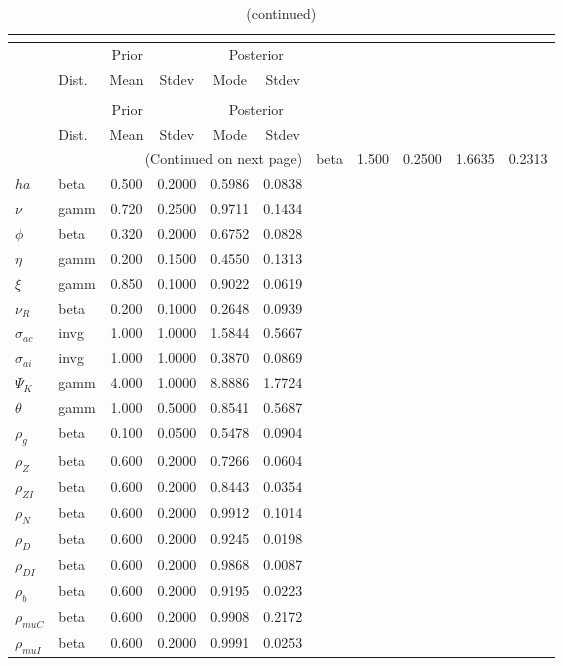  
\begin{center}
\begin{longtable}{llcccc} 
\caption{Results from posterior maximization (parameters)}\\
 \label{Table:Posterior:1}\\
\toprule 
  & \multicolumn{3}{c}{Prior}  &  \multicolumn{2}{c}{Posterior} \\
  \cmidrule(r{.75em}){2-4} \cmidrule(r{.75em}){5-6}
  & Dist. & Mean  & Stdev & Mode & Stdev \\ 
\midrule \endfirsthead 
\caption{(continued)}\\
 \bottomrule 
  & \multicolumn{3}{c}{Prior}  &  \multicolumn{2}{c}{Posterior} \\
  \cmidrule(r{.75em}){2-4} \cmidrule(r{.75em}){5-6}
  & Dist. & Mean  & Stdev & Mode & Stdev \\ 
\midrule \endhead 
\bottomrule \multicolumn{6}{r}{(Continued on next page)}\endfoot 
\bottomrule\endlastfoot 
${\sigma}$ & beta &   1.500 & 0.2500 &   1.6635 &  0.2313 \\ 
${ha}$ & beta &   0.500 & 0.2000 &   0.5986 &  0.0838 \\ 
$\nu$ & gamm &   0.720 & 0.2500 &   0.9711 &  0.1434 \\ 
${\phi}$ & beta &   0.320 & 0.2000 &   0.6752 &  0.0828 \\ 
${\eta}$ & gamm &   0.200 & 0.1500 &   0.4550 &  0.1313 \\ 
$\xi$ & gamm &   0.850 & 0.1000 &   0.9022 &  0.0619 \\ 
${\nu_R}$ & beta &   0.200 & 0.1000 &   0.2648 &  0.0939 \\ 
${\sigma_{ac}}$ & invg &   1.000 & 1.0000 &   1.5844 &  0.5667 \\ 
${\sigma_{ai}}$ & invg &   1.000 & 1.0000 &   0.3870 &  0.0869 \\ 
${\Psi_{K}}$ & gamm &   4.000 & 1.0000 &   8.8886 &  1.7724 \\ 
${\theta}$ & gamm &   1.000 & 0.5000 &   0.8541 &  0.5687 \\ 
${\rho_g}$ & beta &   0.100 & 0.0500 &   0.5478 &  0.0904 \\ 
${\rho_Z}$ & beta &   0.600 & 0.2000 &   0.7266 &  0.0604 \\ 
${\rho_{ZI}}$ & beta &   0.600 & 0.2000 &   0.8443 &  0.0354 \\ 
${\rho_N}$ & beta &   0.600 & 0.2000 &   0.9912 &  0.1014 \\ 
${\rho_D}$ & beta &   0.600 & 0.2000 &   0.9245 &  0.0198 \\ 
${\rho_{DI}}$ & beta &   0.600 & 0.2000 &   0.9868 &  0.0087 \\ 
${\rho_b}$ & beta &   0.600 & 0.2000 &   0.9195 &  0.0223 \\ 
${\rho_{muC}}$ & beta &   0.600 & 0.2000 &   0.9908 &  0.2172 \\ 
${\rho_{muI}}$ & beta &   0.600 & 0.2000 &   0.9991 &  0.0253 \\ 
\end{longtable}
 \end{center}
